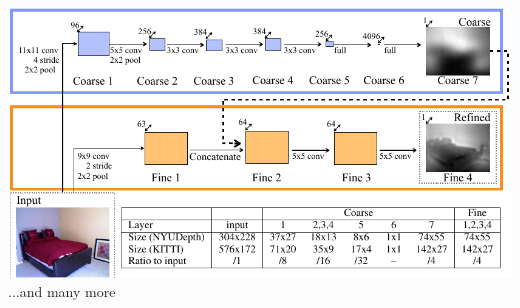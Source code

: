 \documentclass{beamer}
\begin{document}
\begin{frame}
\begin{columns}[T]
\begin{column}{.6\textwidth}
\includegraphics[scale=0.35]{./Figures/network3.pdf} \\
...and many more 
\end{column}
\end{columns}
\end{frame} 
\end{document}
